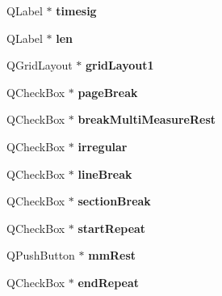 \begin{DoxyCompactItemize}
\mbox{\label{class_ui___measure_base_a78d2993c12150403266aa0ed914fd6d8}} 
Q\+Label $\ast$ {\bfseries timesig}
\item 
\mbox{\label{class_ui___measure_base_aa3f8f2c01a198b927995d02087f356a2}} 
Q\+Label $\ast$ {\bfseries len}
\item 
\mbox{\label{class_ui___measure_base_ab5ddb497c42ede7128c066562d9fba02}} 
Q\+Grid\+Layout $\ast$ {\bfseries grid\+Layout1}
\item 
\mbox{\label{class_ui___measure_base_a40754676e91e0f2dc240286fb165e009}} 
Q\+Check\+Box $\ast$ {\bfseries page\+Break}
\item 
\mbox{\label{class_ui___measure_base_af7dc04e9fbffb48817c0a23b8faa3ef5}} 
Q\+Check\+Box $\ast$ {\bfseries break\+Multi\+Measure\+Rest}
\item 
\mbox{\label{class_ui___measure_base_a205917bdbbedee57293a231f4761a389}} 
Q\+Check\+Box $\ast$ {\bfseries irregular}
\item 
\mbox{\label{class_ui___measure_base_af7f1732352e08ebca8abe5d3400019e0}} 
Q\+Check\+Box $\ast$ {\bfseries line\+Break}
\item 
\mbox{\label{class_ui___measure_base_a61f74fac9f3c412009f774ed9f9bfd07}} 
Q\+Check\+Box $\ast$ {\bfseries section\+Break}
\item 
\mbox{\label{class_ui___measure_base_a5d5670097eb69acd049d242b2814babe}} 
Q\+Check\+Box $\ast$ {\bfseries start\+Repeat}
\item 
\mbox{\label{class_ui___measure_base_a332bc0aa766c50f6501f826b3784b65f}} 
Q\+Push\+Button $\ast$ {\bfseries mm\+Rest}
\item 
\mbox{\label{class_ui___measure_base_a48f7892ea37c5437f8005f2b51e76bdf}} 
Q\+Check\+Box $\ast$ {\bfseries end\+Repeat}
\item 

\end{DoxyCompactItemize}
